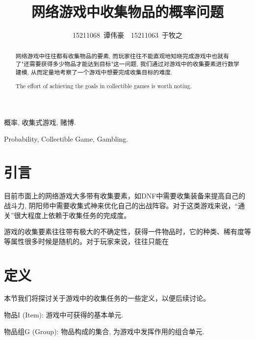 \documentclass[10pt,journal,compsoc]{IEEEtran}
\begin{document}
\title{网络游戏中收集物品的概率问题}

\author{15211068~谭伟豪~~15211063~于牧之}

\maketitle

\newtheorem{definition}{Definition}
\renewcommand{\abstractname}{摘 要}
\renewcommand{\figurename}{图}
\renewcommand{\tablename}{表}
\renewcommand{\IEEEkeywordsname}{关键词}
\begin{abstract}
网络游戏中往往都有收集物品的要素, 而玩家往往不能直观地知晓完成游戏中也就有了"还需要获得多少物品才能达到目标"这一问题, 我们通过对游戏中的收集要素进行数学建模, 从而定量地考察了一个游戏中想要完成收集目标的难度. 
\end{abstract}
\renewcommand{\abstractname}{Abstract}
\begin{abstract}
The effort of achieving the goals in collectible games is worth noting. 
\end{abstract}

\begin{IEEEkeywords}
概率, 收集式游戏, 赌博.
\end{IEEEkeywords}
\renewcommand{\IEEEkeywordsname}{Keywords}
\begin{IEEEkeywords}
Probability, Collectible Game, Gambling.
\end{IEEEkeywords}

\section{引言}

目前市面上的网络游戏大多带有收集要素，如DNF中需要收集装备来提高自己的战斗力, 阴阳师中需要收集式神来优化自己的出战阵容。对于这类游戏来说，“通关”很大程度上依赖于收集任务的完成度。

游戏的收集要素往往带有极大的不确定性，获得一件物品时，它的种类、稀有度等等属性很多时候是随机的。对于玩家来说，往往只能在



\section{定义}

本节我们将探讨关于游戏中的收集任务的一些定义，以便后续讨论。

物品I (Item): 游戏中可获得的基本单元.

物品组G (Group): 物品构成的集合, 为游戏中发挥作用的组合单元.
\end{document}
